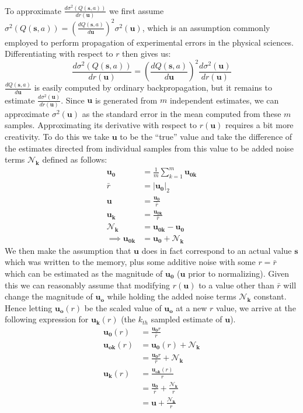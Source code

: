 \documentclass{article}
\begin{document}
To approximate $\frac{d\sigma^2(Q(\pmb{s},a))}{dr(\pmb{u})}$ we first assume $\sigma^2(Q(\pmb{s},a)) = \left(\frac{dQ(\pmb{s},a)}{d\pmb{u}}\right)^2\sigma^2(\pmb{u})$, which is an assumption commonly employed to perform propagation of experimental errors in the physical sciences. Differentiating with respect to $r$ then gives us: 
$$\frac{d\sigma^2(Q(\pmb{s},a))}{dr(\pmb{u})} = \left(\frac{dQ(\pmb{s},a)}{d\pmb{u}}\right)^2\frac{d\sigma^2(\pmb{u})}{dr(\pmb{u})}$$
$\frac{dQ(\pmb{s},a)}{d\pmb{u}}$ is easily computed by ordinary backpropagation, but it remains to estimate $\frac{d\sigma^2(\pmb{u})}{dr(\pmb{u})}$. Since $\pmb{u}$ is generated from $m$ independent estimates, we can approximate $\sigma^2(\pmb{u})$ as the standard error in the mean computed from these $m$ samples. Approximating its derivative with respect to $r(\pmb{u})$ requires a bit more creativity. To do this we take $\pmb{u}$ to be the ``true'' value and take the difference of the estimates directed from individual samples from this value to be added noise terms $\pmb{\mathcal{N}_k}$ defined as follows:
\begin{align*}
\pmb{u_0}&=\frac{1}{m}\sum_{k=1}^m\pmb{u_{0k}}\\
\bar{r}&=|\pmb{u_0}|_2\\
\pmb{u}&=\frac{\pmb{u_0}}{\bar{r}}\\
\pmb{u_k} &= \frac{\pmb{u_{0k}}}{\bar{r}}\\
\pmb{\mathcal{N}_k}&=\pmb{u_{0k}}-\pmb{u_0}\\
\implies\pmb{u_{0k}}&=\pmb{u_0}+\pmb{\mathcal{N}_k}
\end{align*}
We then make the assumption that $\pmb{u}$ does in fact correspond to an actual value $\pmb{s}$ which was written to the memory, plus some additive noise with some $r=\bar{r}$ which can be estimated as the magnitude of $\pmb{u_0}$ ($\pmb{u}$ prior to normalizing). Given this we can reasonably assume that modifying $r(\pmb{u})$ to a value other than $\bar{r}$ will change the magnitude of $\pmb{u_o}$ while holding the added noise terms $\pmb{\mathcal{N}_k}$ constant. Hence letting $\pmb{u_o}(r)$ be the scaled value of $\pmb{u_o}$ at a new $r$ value, we arrive at the following expression for $\pmb{u_k}(r)$ (the $k_{th}$ sampled estimate of $\pmb{u}$).
\begin{align*}
\pmb{u_0}(r) &= \frac{\pmb{u_0}r}{\bar{r}}\\
\pmb{u_{ok}}(r) &= \pmb{u_0}(r)+\pmb{\mathcal{N}_k}\\
&=\frac{\pmb{u_0}r}{\bar{r}}+\pmb{\mathcal{N}_k}\\
\pmb{u_k}(r) &= \frac{\pmb{u_{ok}}(r)}{r}\\
&= \frac{\pmb{u_0}}{\bar{r}}+\frac{\pmb{\mathcal{N}_k}}{r}\\
&=\pmb{u}+\frac{\pmb{\mathcal{N}_k}}{r}
\end{align*}
\end{document}
